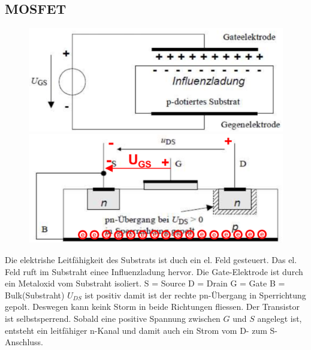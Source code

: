 \subsection{MOSFET}
\begin{figure}
    \vspace{-1cm}
    \includegraphics[width=\linewidth]{images/mosfetprinz}
    \newline
    \includegraphics[width=\linewidth]{images/mosfetprak}
\end{figure}
Die elektrishe Leitfähigkeit des Substrats ist duch ein el. Feld gesteuert. Das el. Feld ruft im Substraht einee Influenzladung hervor.\newline
Die Gate-Elektrode ist durch ein Metaloxid vom Substraht isoliert.\newline\newline
S = Source \quad D = Drain \newline
G = Gate \quad B = Bulk(Substraht)\newline\newline
$ U_{DS} $ ist positiv damit ist der rechte pn-Übergang in Sperrichtung gepolt. Deswegen kann keink Storm in beide Richtungen fliessen.\newline
\rightarrow Der Transistor ist selbstsperrend.\newline
\danger Sobald eine positive Spannung zwischen $ G $ und $ S $ angelegt ist, entsteht ein leitfähiger n-Kanal und damit auch ein Strom vom D- zum S-Anschluss.

